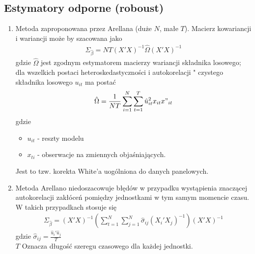 \subsection{Estymatory odporne (roboust)}
\begin{enumerate}
\item Metoda zaproponowana przez Arellana (duże $ N $, małe $ T $). Macierz kowariancji i wariancji może by szacowana jako
\begin{gather*}
\Sigma_{\hat{\beta}}=NT(X'X)^{-1}\hat{\Omega}(X'X)^{-1}
\end{gather*}
gdzie $ \hat{\Omega} $ jest zgodnym estymatorem macierzy wariancji składnika losowego; dla wszelkich postaci heteroskedastyczności i autokorelacji " czystego składnika losowego $ u_{it} $ ma postać
\begin{gather*}
\hat{\Omega}=\frac{1}{NT}\sum_{i=1}^{N}\sum_{t=1}^{T}\hat{u}_{it}^2x_{it}x"_{it}
\end{gather*}
gdzie
\begin{itemize}
\item $ u_{it} $ - reszty modelu
\item $ x_{ti} $ - obserwacje na zmiennych objaśniających.
\end{itemize}
Jest to tzw. korekta White'a uogólniona do danych panelowych.
\item Metoda Arellano niedoszacowuje błędów w przypadku wystąpienia znaczącej autokorelacji zakłóceń pomiędzy jednostkami w tym samym momencie czasu. W takich przypadkach stosuje się
\begin{gather*}
\Sigma_{\hat{\beta}}=(X'X)^{-1}\left(\sum_{t=1}^{N}\sum_{j=1}^{N}\hat{\sigma}_{ij}(X_i'X_j)^{-1}\right)(X'X)^{-1}
\end{gather*}
gdzie $ \hat{\sigma}_{ij}=\frac{\hat{u}_i'\hat{u}_j}{T} $\\
$ T $ Oznacza długość szeregu czasowego dla każdej jednostki.
\end{enumerate}
